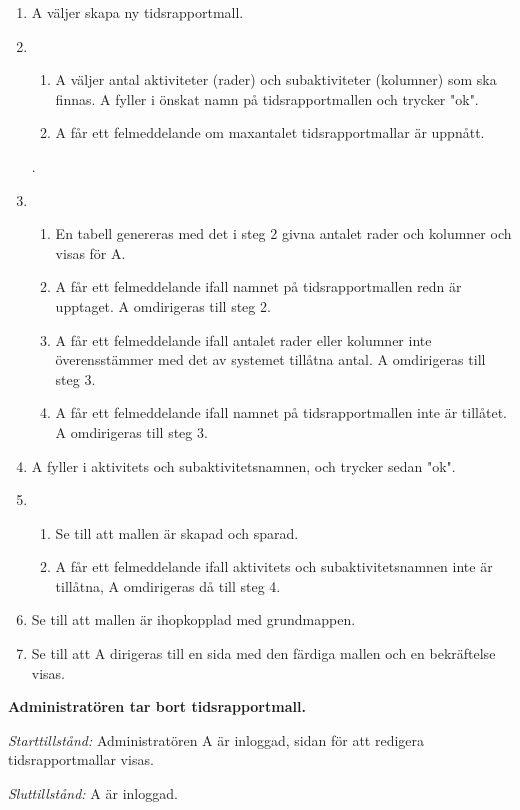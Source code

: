 \documentclass[a4paper]{article}
\begin{document}
\begin{ST}
\begin{enumerate}
\item A väljer skapa ny tidsrapportmall.
\item 
\begin{enumerate}
\item A väljer antal aktiviteter (rader) och subaktiviteter (kolumner) som ska finnas. A fyller i önskat namn på tidsrapportmallen och trycker "ok".
\item A får ett felmeddelande om maxantalet tidsrapportmallar är uppnått.
\end{enumerate}.
\item 
\begin{enumerate}
\item En tabell genereras med det i steg 2 givna antalet rader och kolumner och visas för A.
\item A får ett felmeddelande ifall namnet på tidsrapportmallen redn är upptaget. A omdirigeras till steg 2.
\item A får ett felmeddelande ifall antalet rader eller kolumner inte överensstämmer med det av systemet tillåtna antal. A omdirigeras till steg 3.
\item A får ett felmeddelande ifall namnet på tidsrapportmallen inte är tillåtet. A omdirigeras till steg 3.
\end{enumerate}
\item A fyller i aktivitets och subaktivitetsnamnen, och trycker sedan "ok".
\item
\begin{enumerate}
\item Se till att mallen är skapad och sparad.
\item A får ett felmeddelande ifall aktivitets och subaktivitetsnamnen inte är tillåtna, A omdirigeras då till steg 4.
\end{enumerate}
\item Se till att mallen är ihopkopplad med grundmappen.
\item Se till att A dirigeras till en sida med den färdiga mallen och en bekräftelse visas.

\end{enumerate}

\item
\textbf{Administratören tar bort tidsrapportmall.}

\emph{Starttillstånd:} Administratören A är inloggad, sidan för att redigera tidsrapportmallar visas.

\emph{Sluttillstånd:} A är inloggad.


\end{ST}
\end{document}

